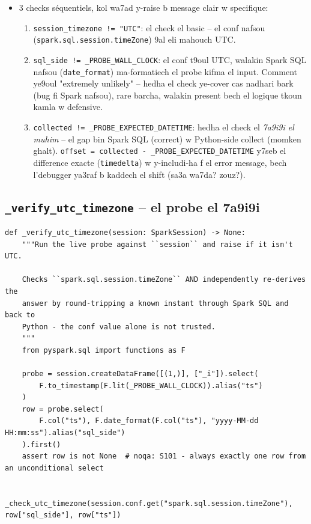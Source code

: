 \documentclass[11pt,a4paper]{report}
\DeclareRobustCommand{\code}[1]{\texttt{#1}}
\begin{document}
\begin{itemize}
  \item 3 checks séquentiels, kol wa7ad y-raise b message clair w specifique:
  \begin{enumerate}
    \item \code{session\_timezone != "UTC"}: el check el basic -- el conf
          nafsou (\code{spark.sql.session.timeZone}) 9al eli mahouch UTC.
    \item \code{sql\_side != \_PROBE\_WALL\_CLOCK}: el conf t9oul UTC,
          walakin Spark SQL nafsou (\code{date\_format}) ma-formatiech el
          probe kifma el input. Comment ye9oul "extremely unlikely" --
          hedha el check ye-cover cas nadhari bark (bug fi Spark nafsou), rare
          barcha, walakin present bech el logique tkoun kamla w defensive.
    \item \code{collected != \_PROBE\_EXPECTED\_DATETIME}: hedha el check
          el \emph{7a9i9i el muhim} -- el gap bin Spark SQL (correct) w
          Python-side collect (momken ghalt). \code{offset = collected -
          \_PROBE\_EXPECTED\_DATETIME} y7seb el difference exacte
          (\code{timedelta}) w y-includi-ha f el error message, bech
          l'debugger ya3raf b kaddech el shift (sa3a wa7da? zouz?).
  \end{enumerate}
\end{itemize}

\subsection{\code{\_verify\_utc\_timezone} -- el probe el 7a9i9i}

\begin{lstlisting}[style=pystyle]
def _verify_utc_timezone(session: SparkSession) -> None:
    """Run the live probe against ``session`` and raise if it isn't UTC.

    Checks ``spark.sql.session.timeZone`` AND independently re-derives the
    answer by round-tripping a known instant through Spark SQL and back to
    Python - the conf value alone is not trusted.
    """
    from pyspark.sql import functions as F

    probe = session.createDataFrame([(1,)], ["_i"]).select(
        F.to_timestamp(F.lit(_PROBE_WALL_CLOCK)).alias("ts")
    )
    row = probe.select(
        F.col("ts"), F.date_format(F.col("ts"), "yyyy-MM-dd HH:mm:ss").alias("sql_side")
    ).first()
    assert row is not None  # noqa: S101 - always exactly one row from an unconditional select

    _check_utc_timezone(session.conf.get("spark.sql.session.timeZone"), row["sql_side"], row["ts"])
\end{lstlisting}
\end{document}
